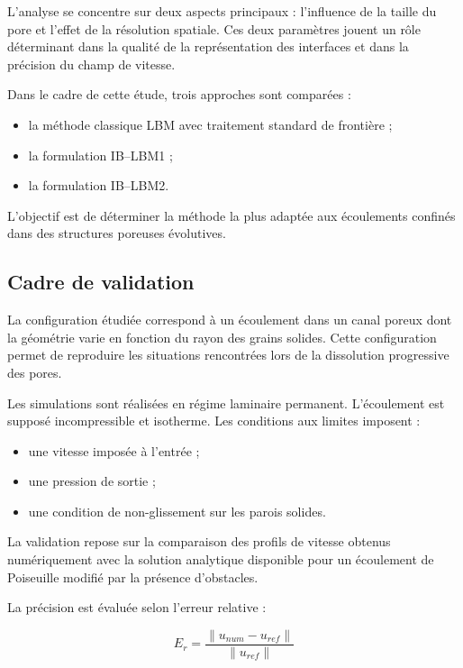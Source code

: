 \documentclass[12pt,a4paper]{report}
\begin{document}
L’analyse se concentre sur deux aspects principaux : l’influence de la taille du pore et l’effet de la résolution spatiale. Ces deux paramètres jouent un rôle déterminant dans la qualité de la représentation des interfaces et dans la précision du champ de vitesse.

Dans le cadre de cette étude, trois approches sont comparées :

\begin{itemize}
\item la méthode classique LBM avec traitement standard de frontière ;
\item la formulation IB--LBM1 ;
\item la formulation IB--LBM2.
\end{itemize}

L’objectif est de déterminer la méthode la plus adaptée aux écoulements confinés dans des structures poreuses évolutives.

\subsection{Cadre de validation}

La configuration étudiée correspond à un écoulement dans un canal poreux dont la géométrie varie en fonction du rayon des grains solides. Cette configuration permet de reproduire les situations rencontrées lors de la dissolution progressive des pores.

Les simulations sont réalisées en régime laminaire permanent. L’écoulement est supposé incompressible et isotherme. Les conditions aux limites imposent :

\begin{itemize}
\item une vitesse imposée à l’entrée ;
\item une pression de sortie ;
\item une condition de non-glissement sur les parois solides.
\end{itemize}

La validation repose sur la comparaison des profils de vitesse obtenus numériquement avec la solution analytique disponible pour un écoulement de Poiseuille modifié par la présence d’obstacles.

La précision est évaluée selon l’erreur relative :

\begin{equation}
E_r
=
\frac{\|u_{num}-u_{ref}\|}{\|u_{ref}\|}
\end{equation}
\end{document}
